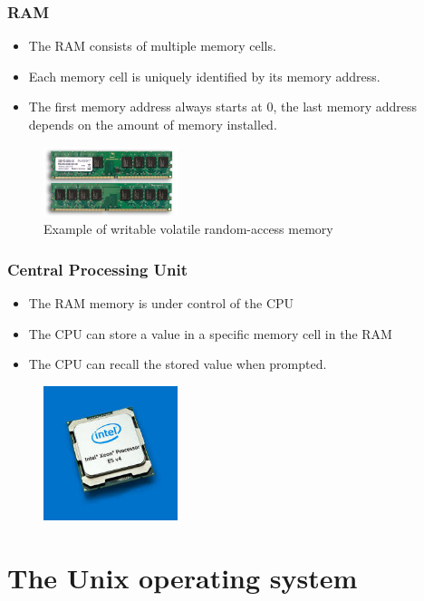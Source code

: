 \documentclass{if-beamer}
\begin{document}
\begin{frame}
\frametitle{RAM}
\begin{itemize}
\item The RAM consists of multiple memory cells.
\item Each memory cell is uniquely identified by its memory address.
\item The first memory address always starts at 0, the last memory address depends on the amount of memory installed.
\end{itemize}

\begin{figure}
\center
\includegraphics[width=0.35\textwidth]{figures/RAM.jpg}
\caption{\tiny Example of writable volatile random-access memory}
\end{figure}
\end{frame}

\begin{frame}
\frametitle{Central Processing Unit}
\begin{itemize}
\item The RAM memory is under control of the CPU
\item The CPU can store a value in a specific memory cell in the RAM
\item The CPU can recall the stored value when prompted.
\end{itemize}
\begin{figure}
\center
\includegraphics[width=0.35\textwidth]{figures/chip.jpg}
\end{figure}
\end{frame}

\section{The Unix operating system}
\end{document}
